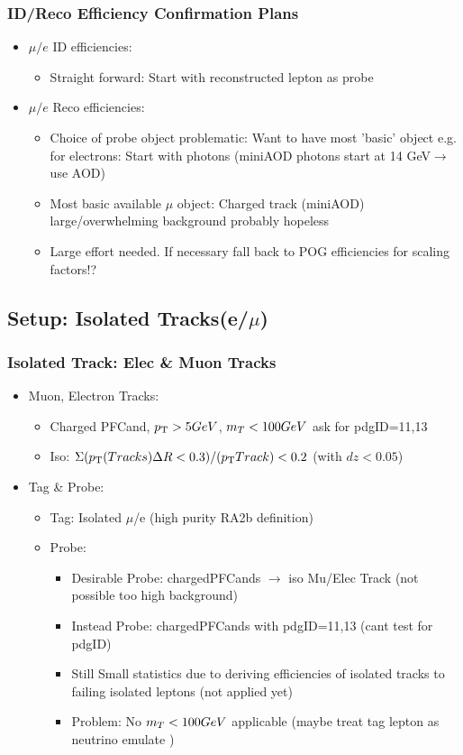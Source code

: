 \documentclass{beamer}
\begin{document}
\begin{frame}
 \frametitle{ID/Reco Efficiency Confirmation Plans}
 \begin{itemize}
  \item $\mu/e$ ID efficiencies:
  \begin{itemize}
   \item Straight forward: Start with reconstructed lepton as probe
  \end{itemize}
  \item $\mu/e$ Reco efficiencies:
  \begin{itemize}
   \item Choice of probe object problematic: Want to have most 'basic' object e.g. for electrons: Start with photons (miniAOD photons start at 14 GeV$\rightarrow$ use AOD)
   \item Most basic available $\mu$ object: Charged track (miniAOD) large/overwhelming background probably hopeless
   \item Large effort needed. If necessary fall back to POG efficiencies for scaling factors!?
  \end{itemize}
 

 \end{itemize}

\end{frame}
\subsection{Setup: Isolated Tracks(e/$\mu$)}
\begin{frame}
 \frametitle{Isolated Track: Elec \& Muon Tracks}
 \begin{itemize}
 \item Muon, Electron Tracks:
 \begin{itemize}
  \item Charged PFCand, $p_{\text{T}}>5 GeV$, $m_{T}<100 GeV$ ask for pdgID=11,13
  \item Iso: $\Sigma ( p_{\text{T}}\text(Tracks)\Delta R<0.3 )/(p_{\text{T}} Track) < 0.2$ (with $dz<0.05$)
 \end{itemize}
 \item Tag \& Probe:
 \begin{itemize}
  \item Tag: Isolated $\mu$/e (high purity RA2b definition)
  \item Probe:
 \begin{itemize}
  \item Desirable Probe: chargedPFCands $\rightarrow$ iso Mu/Elec Track (not possible too high background)
  \item Instead Probe: chargedPFCands with pdgID=11,13 (cant test for pdgID)
  \item Still Small statistics due to deriving efficiencies of isolated tracks to failing isolated leptons (not applied yet)
  \item Problem: No $m_{T}<100 GeV$ applicable (maybe treat tag lepton as neutrino emulate \wtolnu)
 \end{itemize}
  \end{itemize}
 \end{itemize}
\end{frame}
\end{document}
